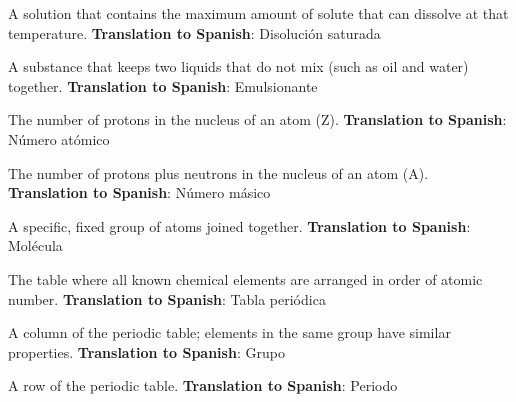 \begin{vocabulary}
    A solution that contains the maximum amount of solute that can dissolve at that temperature. \newline
    \textbf{Translation to Spanish}: Disolución saturada
\end{vocabulary}

\begin{vocabulary}[Emulsifier]
    A substance that keeps two liquids that do not mix (such as oil and water) together. \newline
    \textbf{Translation to Spanish}: Emulsionante
\end{vocabulary}

\begin{vocabulary}
    The number of protons in the nucleus of an atom (Z). \newline
    \textbf{Translation to Spanish}: Número atómico
\end{vocabulary}

\begin{vocabulary}
    The number of protons plus neutrons in the nucleus of an atom (A). \newline
    \textbf{Translation to Spanish}: Número másico
\end{vocabulary}

\begin{vocabulary}[Molecule]
    A specific, fixed group of atoms joined together. \newline
    \textbf{Translation to Spanish}: Molécula
\end{vocabulary}

\begin{vocabulary}
    The table where all known chemical elements are arranged in order of atomic number. \newline
    \textbf{Translation to Spanish}: Tabla periódica
\end{vocabulary}

\begin{vocabulary}[Group]
    A column of the periodic table; elements in the same group have similar properties. \newline
    \textbf{Translation to Spanish}: Grupo
\end{vocabulary}

\begin{vocabulary}[Period]
    A row of the periodic table. \newline
    \textbf{Translation to Spanish}: Periodo
\end{vocabulary}

